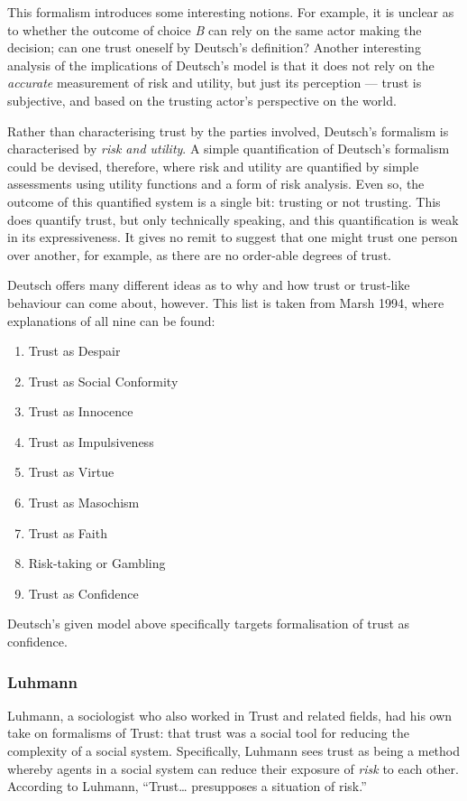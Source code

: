 This formalism introduces some interesting notions. For example, it is unclear as to whether the outcome of choice \emph{B} can rely on the same actor making the decision; can one trust oneself by Deutsch's definition? Another interesting analysis of the implications of Deutsch's model is that it does not rely on the \emph{accurate} measurement of risk and utility, but just its perception --- trust is subjective, and based on the trusting actor's perspective on the world.

Rather than characterising trust by the parties involved, Deutsch's formalism is characterised by \emph{risk and utility}. A simple quantification of Deutsch's formalism could be devised, therefore, where risk and utility are quantified by simple assessments using utility functions and a form of risk analysis. Even so, the outcome of this quantified system is a single bit: trusting or not trusting. This does quantify trust, but only technically speaking, and this quantification is weak in its expressiveness. It gives no remit to suggest that one might trust one person over another, for example, as there are no order-able degrees of trust.

Deutsch offers many different ideas as to why and how trust or trust-like behaviour can come about, however. This list is taken from Marsh 1994\cite{Marsh1994FormalisingConcept}, where explanations of all nine can be found:

\begin{enumerate}
    \item Trust as Despair
    \item Trust as Social Conformity
    \item Trust as Innocence
    \item Trust as Impulsiveness
    \item Trust as Virtue
    \item Trust as Masochism
    \item Trust as Faith
    \item Risk-taking or Gambling
    \item Trust as Confidence
\end{enumerate}

Deutsch's given model above specifically targets formalisation of trust as confidence.

\subsubsection{Luhmann}
Luhmann, a sociologist who also worked in Trust and related fields, had his own take on formalisms of Trust: that trust was a social tool for reducing the complexity of a social system. Specifically, Luhmann sees trust as being a method whereby agents in a social system can reduce their exposure of \emph{risk} to each other. According to Luhmann, ``Trust{\ldots} presupposes a situation of risk.''\par

